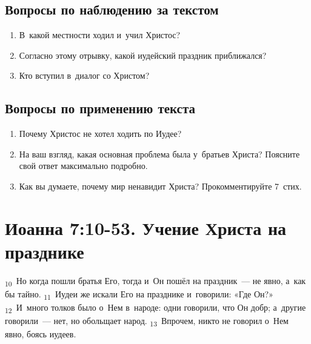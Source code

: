 \documentclass[a4paper,12pt]{article}
\begin{document}
\subsection*{Вопросы по наблюдению за текстом}
\begin{enumerate}
    \item В~какой местности ходил и~учил Христос? 
    
    \myline
    
    \item Согласно этому отрывку, какой иудейский праздник приближался? 
    
    \myline
    
    \item Кто вступил в~диалог со Христом? 
    
    \myline
    
\end{enumerate}

\subsection*{Вопросы по применению текста} 
\begin{enumerate}
    \item Почему Христос не хотел ходить по Иудее? 
    
    \myline
    
    \myline
    \item На ваш взгляд, какая основная проблема была у~братьев Христа? Поясните свой ответ максимально подробно. 
    
    \myline
    
    \myline
    \item Как вы думаете, почему мир ненавидит Христа? Прокомментируйте 7~стих. 
    
    \myline
    
    \myline
\end{enumerate}



\section{Иоанна 7:10-53. Учение Христа на празднике}


\textsubscript{10}~Но когда пошли братья Его, тогда и~Он пошёл на праздник~--- не явно, а~как бы тайно.
\textsubscript{11}~Иудеи же искали Его на празднике и~говорили: «Где Он?»
\textsubscript{12}~И~много толков было о~Нем в~народе: одни говорили, что Он добр; а~другие говорили~--- нет, но обольщает народ.
\textsubscript{13}~Впрочем, никто не говорил о~Нем явно, боясь иудеев.
\end{document}
